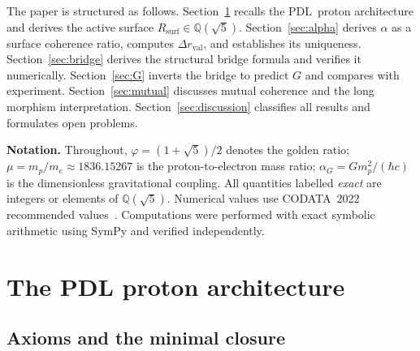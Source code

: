 \documentclass[11pt,a4paper]{article}
\theoremstyle{definition}
\newcommand{\PDL}{\textnormal{PDL}}
\newcommand{\Rsurf}{R_{\mathrm{surf}}}
\newcommand{\alphaG}{\alpha_G}
\newcommand{\vp}{\varphi}
\newcommand{\drval}{\Delta r_{\mathrm{val}}}
\begin{document}
The paper is structured as follows. Section~\ref{sec:proton} recalls the \PDL\ proton architecture and derives the active surface $\Rsurf \in \mathbb{Q}(\sqrt{5})$. Section~\ref{sec:alpha} derives $\alpha$ as a surface coherence ratio, computes $\drval$, and establishes its uniqueness. Section~\ref{sec:bridge} derives the structural bridge formula and verifies it numerically. Section~\ref{sec:G} inverts the bridge to predict $G$ and compares with experiment. Section~\ref{sec:mutual} discusses mutual coherence and the long morphism interpretation. Section~\ref{sec:discussion} classifies all results and formulates open problems.

\medskip\noindent\textbf{Notation.} Throughout, $\vp = (1+\sqrt{5})/2$ denotes the golden ratio; $\mu = m_p/m_e \approx 1836.15267$ is the proton-to-electron mass ratio; $\alphaG = Gm_p^2/(\hbar c)$ is the dimensionless gravitational coupling. All quantities labelled \emph{exact} are integers or elements of $\mathbb{Q}(\sqrt{5})$. Numerical values use CODATA~2022 recommended values~\cite{CODATA_2022}. Computations were performed with exact symbolic arithmetic using SymPy and verified independently.

\section{The PDL proton architecture}
\label{sec:proton}

\subsection{Axioms and the minimal closure}
\label{subsec:closure}
\end{document}
